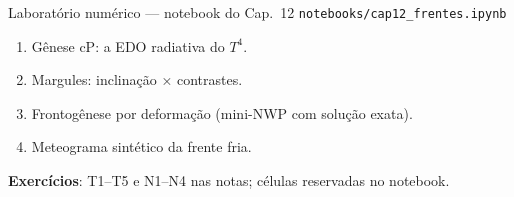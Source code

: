 \documentclass[aspectratio=169,11pt]{beamer}
\begin{document}
\begin{frame}{Laboratório numérico --- notebook do Cap.~12}
  \texttt{notebooks/cap12\_frentes.ipynb}
  \begin{enumerate}
    \item Gênese cP: a EDO radiativa do $T^4$.
    \item Margules: inclinação × contrastes.
    \item Frontogênese por deformação (mini-NWP com solução exata).
    \item Meteograma sintético da frente fria.
  \end{enumerate}
  \vspace{0.4em}
  \textbf{Exercícios}: T1--T5 e N1--N4 nas notas; células reservadas no
  notebook.
  \vfill
  \atribuicao
\end{frame}
\end{document}
